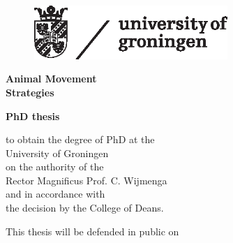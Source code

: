 \thispagestyle{empty}
\begin{titlepage}
    \thispagestyle{empty}
    \begin{addmargin}[-1cm]{-3cm}
    \begin{center}

        \hfill
        \begin{figure}
            \includegraphics[width=7.38cm,height=2.03cm]{figures/rug_logo.eps}
        \end{figure}

        \vspace{12mm}

        {
           {\fontsize{30}{30} \bfseries{Animal Movement\\Strategies}\par}\par
        }

        \vspace{21mm}

        {
           {\fontsize{15}{15} \bfseries{PhD thesis}\par}\par
        }

        \vspace{12mm}

        {\fontsize{14}{15}
            {to obtain the degree of PhD at the\\
            University of Groningen\\
            on the authority of the\\
            Rector Magnificus Prof. C. Wijmenga\\
            and in accordance with\\
            the decision by the College of Deans.}

            \vspace{3mm}

            This thesis will be defended in public on

}
\end{center}
\end{addmargin}
\end{titlepage}
